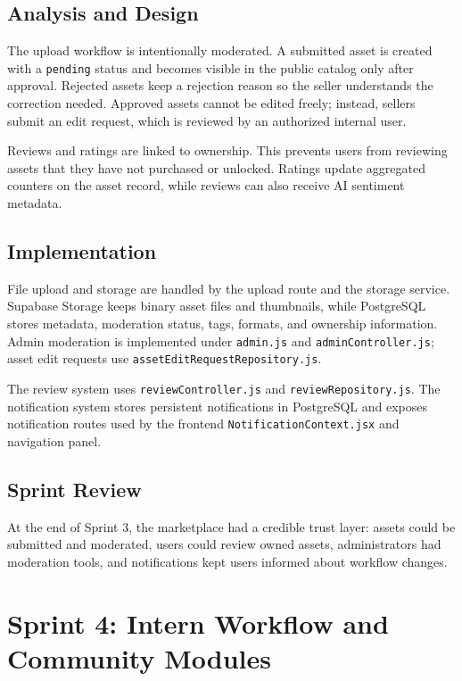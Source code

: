\subsection{Analysis and Design}

The upload workflow is intentionally moderated. A submitted asset is created with a
\texttt{pending} status and becomes visible in the public catalog only after approval.
Rejected assets keep a rejection reason so the seller understands the correction needed.
Approved assets cannot be edited freely; instead, sellers submit an edit request, which is
reviewed by an authorized internal user.

Reviews and ratings are linked to ownership. This prevents users from reviewing assets that
they have not purchased or unlocked. Ratings update aggregated counters on the asset record,
while reviews can also receive AI sentiment metadata.

\subsection{Implementation}

File upload and storage are handled by the upload route and the storage service. Supabase
Storage keeps binary asset files and thumbnails, while PostgreSQL stores metadata,
moderation status, tags, formats, and ownership information. Admin moderation is implemented
under \texttt{admin.js} and \texttt{adminController.js}; asset edit requests use
\texttt{assetEditRequestRepository.js}.

The review system uses \texttt{reviewController.js} and \texttt{reviewRepository.js}. The
notification system stores persistent notifications in PostgreSQL and exposes notification
routes used by the frontend \texttt{NotificationContext.jsx} and navigation panel.

\subsection{Sprint Review}

At the end of Sprint 3, the marketplace had a credible trust layer: assets could be submitted
and moderated, users could review owned assets, administrators had moderation tools, and
notifications kept users informed about workflow changes.

\section{Sprint 4: Intern Workflow and Community Modules}


